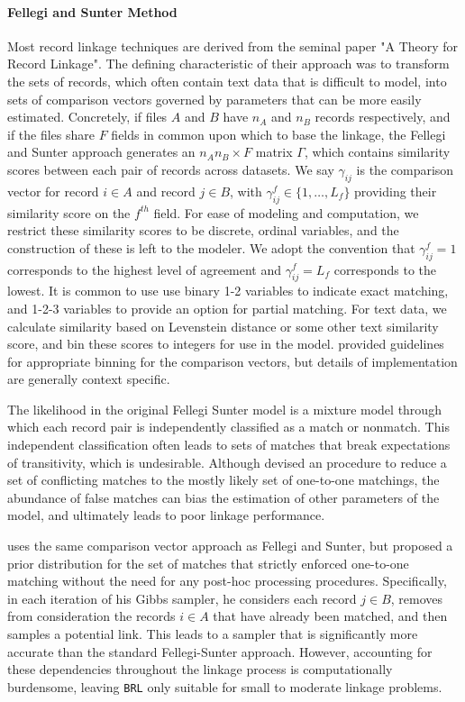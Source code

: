 \documentclass[12pt,letterpaper]{article}
\newcommand{\1}[1]{\mathbb{I}\!\left[#1\right]} %
\begin{document}
\paragraph{Fellegi and Sunter Method}
Most record linkage techniques are derived from the seminal \citep{fs} paper "A Theory for Record Linkage". The defining
characteristic of their approach was to transform the sets of records,
which often contain text data that is difficult to model, into sets of
comparison vectors governed by parameters that can be more easily
estimated. Concretely, if files \(A\) and \(B\) have \(n_A\) and \(n_B\)
records respectively, and if the files share \(F\) fields in common upon
which to base the linkage, the Fellegi and Sunter approach generates an
\(n_A n_B \times F\) matrix \(\Gamma\), which contains similarity scores
between each pair of records across datasets. We say \(\gamma_{ij}\) is
the comparison vector for record \(i \in A\) and record \(j \in B\),
with \(\gamma_{ij}^f \in \{1, \ldots, L_f\}\) providing their similarity
score on the \(f^{th}\) field. For ease of modeling and computation, we
restrict these similarity scores to be discrete, ordinal variables, and
the construction of these is left to the modeler. We adopt the
convention that \(\gamma_{ij}^f = 1\) corresponds to the highest level
of agreement and \(\gamma_{ij}^f = L_f\) corresponds to the lowest. It
is common to use use binary 1-2 variables to indicate exact matching,
and 1-2-3 variables to provide an option for partial matching. For text
data, we calculate similarity based on Levenstein distance or some other
text similarity score, and bin these scores to integers for use in the
model. \citep{jaro1989} provided guidelines for appropriate binning for the
comparison vectors, but details of implementation are generally context
specific.

The likelihood in the original Fellegi Sunter model is a mixture model
through which each record pair is independently classified as a match or
nonmatch. This independent classification often leads to sets of matches
that break expectations of transitivity, which is undesirable. Although
\citep{jaro1995} devised an procedure to reduce a set of conflicting matches to the
mostly likely set of one-to-one matchings, the abundance of false
matches can bias the estimation of other parameters of the model, and ultimately leads to poor linkage performance. 

\citep{sadinle2017} uses the same comparison vector approach as Fellegi and Sunter, but proposed a prior distribution for the set of matches that strictly enforced one-to-one matching without the need for any post-hoc processing procedures. Specifically, in each iteration of his Gibbs sampler, he considers each record \(j\in B\), removes from consideration the records \(i\in A\) that have already been matched, and then samples a potential link. This leads to a sampler that is significantly more accurate than the standard Fellegi-Sunter approach. However,
accounting for these dependencies throughout the linkage process is
computationally burdensome, leaving \texttt{BRL} only suitable for small
to moderate linkage problems.
\end{document}

